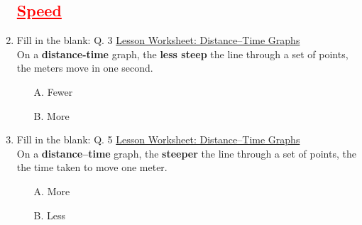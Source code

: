\documentclass[A4,12pt]{article}
\begin{document}
\begin{enumerate}[label=\bfseries (\arabic*)]







\subsection*{\textcolor{red}{\underline{Speed}}}








\item Fill in the blank: \cite{Nagwa} Q. 3 \href{https://www.nagwa.com/en/worksheets/964158724874/}{Lesson Worksheet: Distance–Time Graphs}\\ 
On a \textbf{distance-time} graph, the \textbf{less steep} the line through a set of points, the \underline{\hspace{3cm}} meters move in one second.
%
\begin{multicols}{2}
\begin{itemize}
    \item[A.] Fewer
    \item[B.] More
\end{itemize}
\end{multicols}








\item Fill in the blank: \cite{Nagwa} Q. 5 \href{https://www.nagwa.com/en/worksheets/964158724874/}{Lesson Worksheet: Distance–Time Graphs}\\ 
On a \textbf{distance–time} graph, the \textbf{steeper} the line through a set of points, the \underline{\hspace{3cm}} the time taken to move one meter.
%
\begin{multicols}{2}
\begin{itemize}
    \item[A.] More
    \item[B.] Less
\end{itemize}
\end{multicols}











\end{enumerate}
\end{document}
